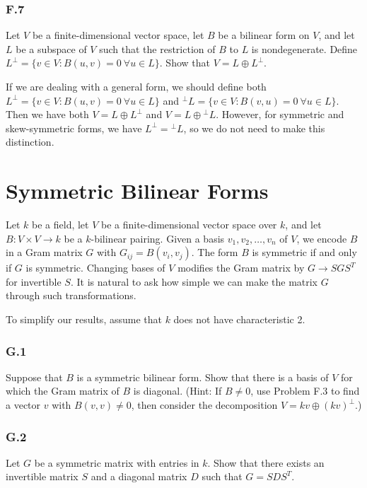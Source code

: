 \documentclass[lang=cn,11pt]{template}
\begin{document}
\subsection*{F.7} Let \( V \) be a finite-dimensional vector space, let \( B \) be a bilinear form on \( V \), and let \( L \) be a subspace of \( V \) such that the restriction of \( B \) to \( L \) is nondegenerate. Define \( L^\perp = \{v \in V : B(u, v) = 0 \ \forall u \in L\} \). Show that \( V = L \oplus L^\perp \).

\begin{remark}
If we are dealing with a general form, we should define both \( L^\perp = \{v \in V : B(u, v) = 0 \ \forall u \in L\} \) and \( {}^\perp L = \{v \in V : B(v, u) = 0 \ \forall u \in L\} \). Then we have both \( V = L \oplus L^\perp \) and \( V = L \oplus {}^\perp L \). However, for symmetric and skew-symmetric forms, we have \( L^\perp = {}^\perp L \), so we do not need to make this distinction.
\end{remark}

\chapter{Symmetric Bilinear Forms}

Let \( k \) be a field, let \( V \) be a finite-dimensional vector space over \( k \), and let \( B : V \times V \to k \) be a \( k \)-bilinear pairing. Given a basis \( v_1, v_2, \dots, v_n \) of \( V \), we encode \( B \) in a Gram matrix \( G \) with \( G_{ij} = B(v_i, v_j) \). The form \( B \) is symmetric if and only if \( G \) is symmetric. Changing bases of \( V \) modifies the Gram matrix by \( G \to S G S^T \) for invertible \( S \). It is natural to ask how simple we can make the matrix \( G \) through such transformations.

To simplify our results, assume that \( k \) does not have characteristic 2.

\subsection*{G.1} Suppose that \( B \) is a symmetric bilinear form. Show that there is a basis of \( V \) for which the Gram matrix of \( B \) is diagonal. (Hint: If \( B \neq 0 \), use Problem F.3 to find a vector \( v \) with \( B(v, v) \neq 0 \), then consider the decomposition \( V = k v \oplus (k v)^\perp \).)

\subsection*{G.2} Let \( G \) be a symmetric matrix with entries in \( k \). Show that there exists an invertible matrix \( S \) and a diagonal matrix \( D \) such that \( G = S D S^T \).
\end{document}
